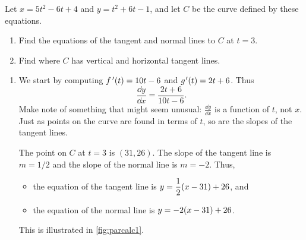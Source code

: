\begin{example}\label{ex_parcalc1}%
Let $x=5t^2-6t+4$ and $y=t^2+6t-1$, and let $C$ be the curve defined by these equations.
\begin{enumerate}
	\item	Find the equations of the tangent and normal lines to $C$ at $t=3$.
	\item	Find where $C$ has vertical and horizontal tangent lines.
\end{enumerate}
\solution
\begin{enumerate}
	\item We start by computing $f\,'(t) = 10t-6$ and $g\primeskip'(t) =2t+6$. Thus \[\frac{\dd y}{\dd x} = \frac{2t+6}{10t-6}.\]
	Make note of something that might seem unusual: $\frac{\dd y}{\dd x}$ is a function of $t$, not $x$. Just as points on the curve are found in terms of $t$, so are the slopes of the tangent lines.

	The point on $C$ at $t=3$ is $(31,26)$. The slope of the tangent line is $m=1/2$ and the slope of the normal line is $m=-2$. Thus,
	\begin{itemize}
		\item the equation of the tangent line is $\displaystyle y=\frac12(x-31)+26$, and
		\item	the equation of the normal line is $\displaystyle y=-2(x-31)+26$.
	\end{itemize}
	This is illustrated in \autoref{fig:parcalc1}.



\end{enumerate}
\end{example}
